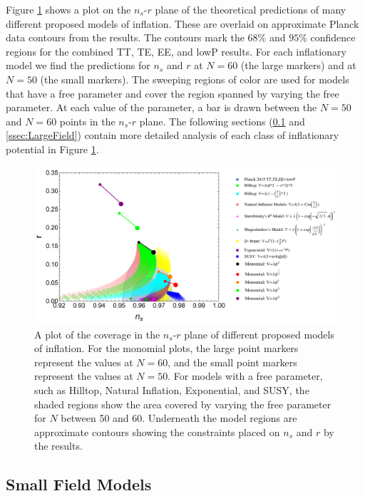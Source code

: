 \documentclass[a4paper,11pt]{article}
\def\nsr{$n_s$-$r$ }
\begin{document}
Figure \ref{fig:Planck} shows a plot on the \nsr plane of the theoretical predictions of many different proposed models of inflation. These are overlaid on approximate Planck data contours from the \citet{Planck2015} results. The contours mark the $68\%$ and $95\%$ confidence regions for the combined TT, TE, EE, and lowP results. For each inflationary model we find the predictions for $n_s$ and $r$ at $N=60$ (the large markers) and at $N=50$ (the small markers). The sweeping regions of color are used for models that have a free parameter and cover the region spanned by varying the free parameter. At each value of the parameter, a bar is drawn between the $N=50$ and $N=60$ points in the \nsr plane. The following sections (\ref{ssec:SmallField} and \ref{ssec:LargeField}) contain more detailed analysis of each class of inflationary potential in Figure \ref{fig:Planck}. 

\begin{figure}[h]
	\centering
	\includegraphics[width=\textwidth]{figures/PlanckPlotLegendsFinal.pdf}
	\caption[Coverage in the \nsr plane of proposed models of inflation.]{A plot of the coverage in the \nsr plane of different proposed models of inflation. For the monomial plots, the large point markers represent the values at $N=60$, and the small point markers represent the values at $N=50$. For models with a free parameter, such as Hilltop, Natural Inflation, Exponential, and SUSY, the shaded regions show the area covered by varying the free parameter for $N$ between 50 and 60. Underneath the model regions are approximate contours showing the constraints placed on $n_s$ and $r$ by the \citet{Planck2015} results.}
	\label{fig:Planck}
\end{figure}

\subsection{Small Field Models}
\label{ssec:SmallField}
\end{document}
